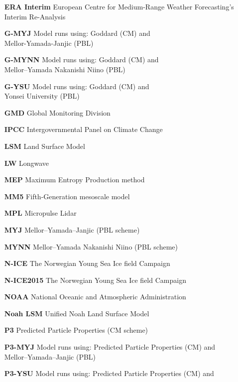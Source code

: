 \begin{enumerate}
    \item[\textbf{ERA Interim}] European Centre for Medium-Range Weather Forecasting’s Interim Re-Analysis
    \item[\textbf{G-MYJ}] Model runs using: Goddard (CM) and \\
    \hspace*{3.3cm} Mellor-Yamada-Janjic (PBL)
    \item[\textbf{G-MYNN}] Model runs using: Goddard (CM) and \\
    \hspace*{3.3cm} Mellor–Yamada Nakanishi Niino (PBL)
    \item[\textbf{G-YSU}] Model runs using: Goddard (CM) and \\
    \hspace*{3.3cm} Yonsei University (PBL)
    \item[\textbf{GMD}] Global Monitoring Division
    \item[\textbf{IPCC}] Intergovernmental Panel on Climate Change
    \item[\textbf{LSM}] Land Surface Model
    \item[\textbf{LW}] Longwave
    \item[\textbf{MEP}] Maximum Entropy Production method
    \item[\textbf{MM5}] Fifth-Generation mesoscale model
    \item[\textbf{MPL}] Micropulse Lidar
    \item[\textbf{MYJ}] Mellor–Yamada–Janjic (PBL scheme)
    \item[\textbf{MYNN}] Mellor–Yamada Nakanishi Niino (PBL scheme)
    \item[\textbf{N-ICE}] The Norwegian Young Sea Ice field Campaign
    \item[\textbf{N-ICE2015}] The Norwegian Young Sea Ice field Campaign
    \item[\textbf{NOAA}] National Oceanic and Atmospheric Administration
    \item[\textbf{Noah LSM}] Unified Noah Land Surface Model
    \item[\textbf{P3}] Predicted Particle Properties (CM scheme)
    \item[\textbf{P3-MYJ}] Model runs using: Predicted Particle Properties (CM) and \\
    \hspace*{3.3cm} Mellor–Yamada–Janjic (PBL)
    \item[\textbf{P3-YSU}] Model runs using: Predicted Particle Properties (CM) and \\

\end{enumerate}
